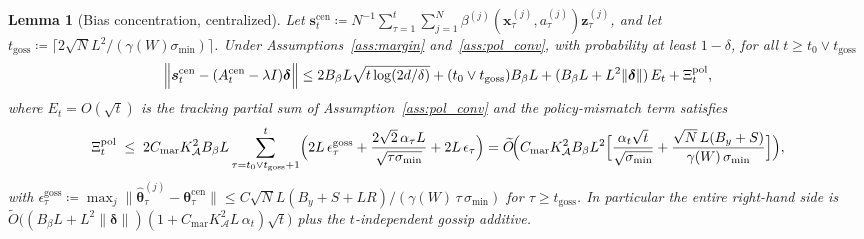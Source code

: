 \documentclass[11pt]{article}
\newtheorem{lemma}[theorem]{Lemma}
\newcommand{\Ot}{\widetilde{O}}
\begin{document}
\begin{lemma}[Bias concentration, centralized]\label{lem:bias}
Let $\bm{s}_t^{\mathrm{cen}}\coloneqq
N^{-1}\sum_{\tau=1}^t\sum_{j=1}^N
\beta^{(j)}(\bm{x}_\tau^{(j)},a_\tau^{(j)})\bm{z}_\tau^{(j)}$,
and let
$t_{\mathrm{goss}}\coloneqq\lceil 2\sqrt N L^2/(\gamma(W)\sigma_{\min})\rceil$.
Under Assumptions~\ref{ass:margin} and~\ref{ass:pol_conv}, with
probability at least $1-\delta$, for all
$t\geq t_0\vee t_{\mathrm{goss}}$ \[
\Bigl\|\bm{s}_t^{\mathrm{cen}}-(A_t^{\mathrm{cen}}-\lambda I)\bm{\delta}\Bigr\|
\leq 2B_\beta L\sqrt{t\log(2d/\delta)}
+(t_0\vee t_{\mathrm{goss}}) B_\beta L
+(B_\beta L+L^2\|\bm{\delta}\|)\,E_t
+\Xi_t^{\mathrm{pol}},
\]
where $E_t=O(\sqrt t)$ is the tracking partial sum of
Assumption~\ref{ass:pol_conv} and the policy-mismatch term satisfies
\[
\Xi_t^{\mathrm{pol}}
\;\leq\;
2C_{\mathrm{mar}}K_{\mathcal{A}}^2 B_\beta L
\sum_{\tau=t_0\vee t_{\mathrm{goss}}+1}^{t}
\Bigl(
2L\,\epsilon_\tau^{\mathrm{goss}}
+\frac{2\sqrt2\,\alpha_\tau L}{\sqrt{\tau\sigma_{\min}}}
+2L\,\epsilon_\tau
\Bigr)
=\Ot\!\Bigl(
C_{\mathrm{mar}}K_{\mathcal{A}}^2 B_\beta L^2\Bigl[
\frac{\alpha_t\sqrt{t}}{\sqrt{\sigma_{\min}}}
+\frac{\sqrt N\,L(B_y+S)}{\gamma(W)\,\sigma_{\min}}
\Bigr]\Bigr),
\]
with
$\epsilon_\tau^{\mathrm{goss}}\coloneqq
\max_j\|\widehat{\bm\theta}_\tau^{(j)}-\bm\theta_\tau^{\mathrm{cen}}\|
\leq C\sqrt N L(B_y+S+L R)/(\gamma(W)\,\tau\,\sigma_{\min})$
for $\tau\geq t_{\mathrm{goss}}$.
In particular the entire right-hand side is
$\Ot\bigl((B_\beta L+L^2\|\bm\delta\|)(1+C_{\mathrm{mar}}K_{\mathcal{A}}^2 L\,\alpha_t)\sqrt{t}\bigr)$
plus the $t$-independent gossip additive.
\end{lemma}
\end{document}
